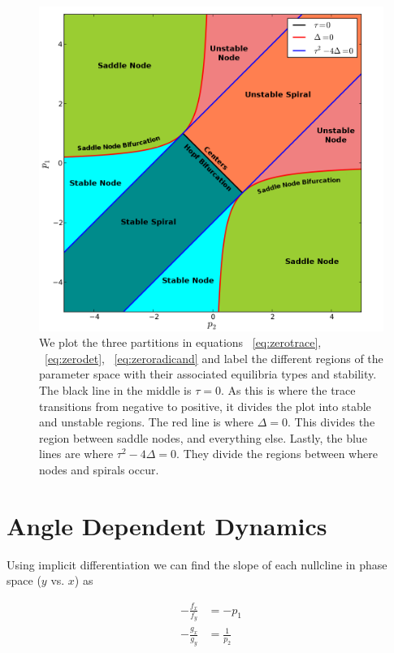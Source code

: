\documentclass{article}
\begin{document}
\begin{figure}[h!]
\centering
\includegraphics[scale=0.70]{figures/p1vsp2_full_labels.png}
\caption{We plot the three partitions in equations ~\ref{eq:zerotrace},
    ~\ref{eq:zerodet}, ~\ref{eq:zeroradicand} and label the different regions of
    the parameter space with their associated equilibria types and stability.
The black line in the middle is $\tau=0$. As this is where the trace transitions
from negative to positive, it divides the plot into stable and unstable regions.
The red line is where $\Delta=0$. This divides the region between saddle nodes,
and everything else. Lastly, the blue lines are where $\tau^2-4\Delta=0$. They
divide the regions between where nodes and spirals occur.}
\label{fig:p1vsp2}
\end{figure}

\section{Angle Dependent Dynamics}\label{sec:angles}

Using implicit differentiation we can find the slope of each nullcline in phase
space ($y$ vs. $x$) as

\begin{align}
-\frac{f_x}{f_y} &= -p_1 \\
-\frac{g_x}{g_y} &= \frac{1}{p_2}
\end{align}
\end{document}
